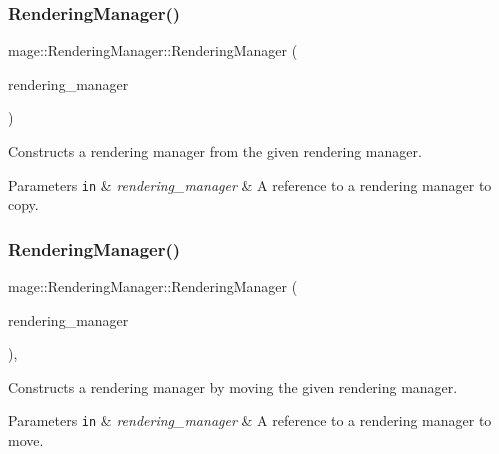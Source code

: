 \subsubsection{\texorpdfstring{Rendering\+Manager()}{RenderingManager()}\hspace{0.1cm}{\footnotesize\ttfamily [2/3]}}
{\footnotesize\ttfamily mage\+::\+Rendering\+Manager\+::\+Rendering\+Manager (\begin{DoxyParamCaption}\item[{const \hyperlink{classmage_1_1_rendering_manager}{Rendering\+Manager} \&}]{rendering\+\_\+manager }\end{DoxyParamCaption})\hspace{0.3cm}{\ttfamily [delete]}}

Constructs a rendering manager from the given rendering manager.


\begin{DoxyParams}[1]{Parameters}
\mbox{\tt in}  & {\em rendering\+\_\+manager} & A reference to a rendering manager to copy. \\
\hline
\end{DoxyParams}
\hypertarget{classmage_1_1_rendering_manager_a06c7ad1cb8164b4e33ba52f7d297aa4a}{}\label{classmage_1_1_rendering_manager_a06c7ad1cb8164b4e33ba52f7d297aa4a} 
\subsubsection{\texorpdfstring{Rendering\+Manager()}{RenderingManager()}\hspace{0.1cm}{\footnotesize\ttfamily [3/3]}}
{\footnotesize\ttfamily mage\+::\+Rendering\+Manager\+::\+Rendering\+Manager (\begin{DoxyParamCaption}\item[{\hyperlink{classmage_1_1_rendering_manager}{Rendering\+Manager} \&\&}]{rendering\+\_\+manager }\end{DoxyParamCaption})\hspace{0.3cm}{\ttfamily [default]}, {\ttfamily [noexcept]}}

Constructs a rendering manager by moving the given rendering manager.


\begin{DoxyParams}[1]{Parameters}
\mbox{\tt in}  & {\em rendering\+\_\+manager} & A reference to a rendering manager to move. \\
\hline
\end{DoxyParams}
\hypertarget{classmage_1_1_rendering_manager_a4164e70f014de8d0348c35d5142cedab}{}\label{classmage_1_1_rendering_manager_a4164e70f014de8d0348c35d5142cedab} 
